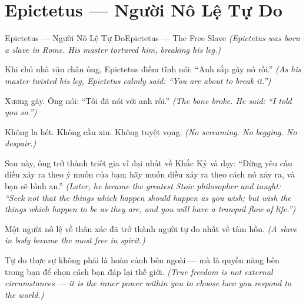 \section{Epictetus — Người Nô Lệ Tự Do}
\begin{truyen}{Epictetus — Người Nô Lệ Tự Do}{Epictetus — The Free Slave}
\textit{(Epictetus was born a slave in Rome. His master tortured him, breaking his leg.)}

Khi chủ nhà vặn chân ông, Epictetus điềm tĩnh nói: ``Anh sắp gãy nó rồi.''
\textit{(As his master twisted his leg, Epictetus calmly said: ``You are about to break it.'')}

Xương gãy. Ông nói: ``Tôi đã nói với anh rồi.''
\textit{(The bone broke. He said: ``I told you so.'')}

Không la hét. Không cầu xin. Không tuyệt vọng.
\textit{(No screaming. No begging. No despair.)}

Sau này, ông trở thành triết gia vĩ đại nhất về Khắc Kỷ và dạy: ``Đừng yêu cầu điều xảy ra theo ý muốn của bạn; hãy muốn điều xảy ra theo cách nó xảy ra, và bạn sẽ bình an.''
\textit{(Later, he became the greatest Stoic philosopher and taught: ``Seek not that the things which happen should happen as you wish; but wish the things which happen to be as they are, and you will have a tranquil flow of life.'')}

Một người nô lệ về thân xác đã trở thành người tự do nhất về tâm hồn.
\textit{(A slave in body became the most free in spirit.)}

\end{truyen}

\begin{baihoc}
Tự do thực sự không phải là hoàn cảnh bên ngoài — mà là quyền năng bên trong bạn để chọn cách bạn đáp lại thế giới.
\textit{(True freedom is not external circumstances — it is the inner power within you to choose how you respond to the world.)}
\end{baihoc}
\ngancach


